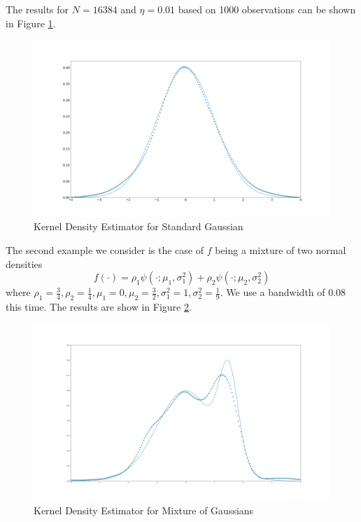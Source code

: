 \documentclass[a4paper,11pt]{article}
\theoremstyle{theorem}
\theoremstyle{definition}
\theoremstyle{remark}
\begin{document}
The results for $N = 16384$ and $\eta = 0.01$ based on 1000 observations can be shown in Figure \ref{stdNormal}.

\begin{figure}[h]
\centering
\includegraphics[scale=0.15]{spectralKDE.png}
\caption{Kernel Density Estimator for Standard Gaussian}
\label{stdNormal}
\end{figure} 

The second example we consider is the case of $f$ being a mixture of two normal densities
\[
f(\cdot) = \rho_{1}\psi(\cdot;\mu_{1},\sigma_{1}^{2}) + \rho_{2}\psi(\cdot;\mu_{2}, \sigma_{2}^{2}) 
\] 
where $\rho_{1} = \frac{3}{4}, \rho_{2} = \frac{1}{4}, \mu_{1} = 0, \mu_{2} = \frac{3}{2}, \sigma_{1}^{2} = 1, \sigma_{2}^{2} = \frac{1}{9}$. We use a bandwidth of 0.08 this time. The results are show in Figure \ref{MoG}.

\begin{figure}[h]
\centering
\includegraphics[scale=0.15]{spectralKDEMoG.png}
\caption{Kernel Density Estimator for Mixture of Gaussians}
\label{MoG}
\end{figure}
\end{document}
